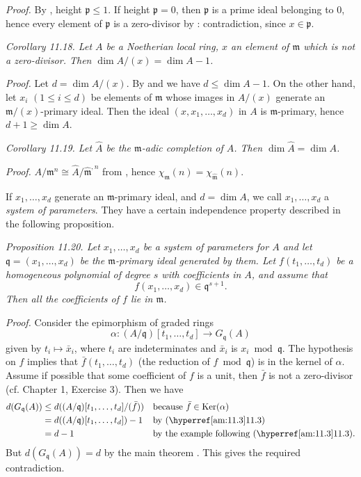 \textit{Proof.} By , height $\mathfrak p\leq1$. If height $\mathfrak p=0$, then $\mathfrak p$ is a prime ideal belonging to 0, hence every element of $\mathfrak p$ is a zero-divisor by : contradiction, since $x\in\mathfrak p$. \proofbox

\medskip
\noindent\textit{Corollary 11.18. Let $A$ be a Noetherian local ring, $x$ an element of $\mathfrak m$ which is not a zero-divisor. Then $\dim A/(x)=\dim A-1$.}

\textit{Proof.} Let $d=\dim A/(x)$. By  and  we have $d\leq\dim A-1$. On the other hand, let $x_i$ $(1\leq i\leq d)$ be elements of $\mathfrak m$ whose images in $A/(x)$ generate an $\mathfrak m/(x)$-primary ideal. Then the ideal $(x,x_1,\ldots,x_d)$ in $A$ is $\mathfrak m$-primary, hence $d+1\geq\dim A$. \proofbox

\medskip
\noindent\textit{Corollary 11.19. Let $\widehat A$ be the $\mathfrak m$-adic completion of $A$. Then $\dim\widehat A=\dim A$.}

\textit{Proof.} $A/\mathfrak m^n\cong\widehat A/\widehat{\mathfrak m}^{,n}$ from , hence $\chi_{\mathfrak m}(n)=\chi_{\widehat{\mathfrak m}}(n)$. \proofbox

If $x_1,\ldots,x_d$ generate an $\mathfrak m$-primary ideal, and $d=\dim A$, we call $x_1,\ldots,x_d$ a \textit{system of parameters}. They have a certain independence property described in the following proposition.

\medskip
\noindent\textit{Proposition 11.20. Let $x_1,\ldots,x_d$ be a system of parameters for $A$ and let $\mathfrak q=(x_1,\ldots,x_d)$ be the $\mathfrak m$-primary ideal generated by them. Let $f(t_1,\ldots,t_d)$ be a homogeneous polynomial of degree $s$ with coefficients in $A$, and assume that}
\[
 f(x_1,\ldots,x_d)\in\mathfrak q^{s+1}.
\]
\textit{Then all the coefficients of $f$ lie in $\mathfrak m$.}

\textit{Proof.} Consider the epimorphism of graded rings
\[
 \alpha:(A/\mathfrak q)[t_1,\ldots,t_d]\longrightarrow G_{\mathfrak q}(A)
\]
given by $t_i\mapsto\bar x_i$, where $t_i$ are indeterminates and $\bar x_i$ is $x_i\bmod\mathfrak q$. The hypothesis on $f$ implies that $\bar f(t_1,\ldots,t_d)$ (the reduction of $f\bmod\mathfrak q$) is in the kernel of $\alpha$. Assume if possible that some coefficient of $f$ is a unit, then $\bar f$ is not a zero-divisor (cf. Chapter 1, Exercise 3). Then we have
\begin{align*}
 d(G_{\mathfrak q}(A))&\leq d((A/\mathfrak q)[t_1,\ldots,t_d]/(\bar f)) &&\text{because $\bar f\in\operatorname{Ker}(\alpha)$}\\
 &=d((A/\mathfrak q)[t_1,\ldots,t_d])-1 &&\text{by \amref{11.3}}\\
 &=d-1 &&\text{by the example following \amref{11.3}.}
\end{align*}
But $d(G_{\mathfrak q}(A))=d$ by the main theorem . This gives the required contradiction. \proofbox

